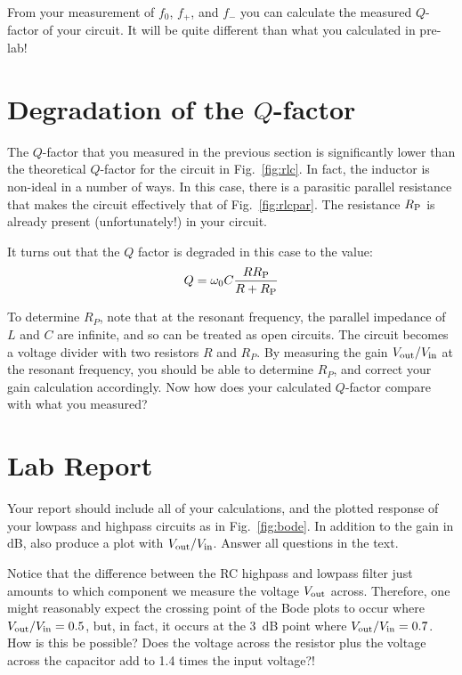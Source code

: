 From your measurement of $f_0$, $f_+$, and $f_-$ you can calculate the measured $Q$-factor of your circuit.  It will be quite different than what you calculated in pre-lab! 

\section{Degradation of the $Q$-factor}

The $Q$-factor that you measured in the previous section is significantly lower than the theoretical $Q$-factor for the circuit in Fig.~\ref{fig:rlc}.  In fact, the inductor is non-ideal in a number of ways.  In this case, there is a parasitic parallel resistance that makes the circuit effectively that of Fig.~\ref{fig:rlcpar}.  The resistance $R_{\rm P}$ is already present (unfortunately!) in your circuit.  

It turns out that the $Q$ factor is degraded in this case to the value:
\begin{equation}
Q = \omega_0 C \frac{R R_{\rm P}}{R+R_{\rm P}}
\end{equation}

To determine $R_P$, note that at the resonant frequency, the parallel impedance of $L$ and $C$ are infinite, and so can be treated as open circuits.  The circuit becomes a voltage divider with two resistors $R$ and $R_P$.  By measuring the gain $V_{\rm out}/V_{\rm in}$ at the resonant frequency, you should be able to determine $R_P$, and correct your gain calculation accordingly.  Now how does your calculated $Q$-factor compare with what you measured?


\section{Lab Report}

Your report should include all of your calculations, and the plotted response of your lowpass and highpass circuits as in Fig.~\ref{fig:bode}.  In addition to the gain in dB, also produce a plot with $V_{\rm out}/V_{\rm in}$.  Answer all questions in the text.

Notice that the difference between the RC highpass and lowpass filter just amounts to which component we measure the voltage $V_{\rm out}$ across.  Therefore, one might reasonably expect the crossing point of the Bode plots to occur where $V_{\rm out}/V_{\rm in} = 0.5$, but, in fact, it occurs at the 3~dB point where $V_{\rm out}/V_{\rm in} = 0.7$.  How is this be possible?  Does the voltage across the resistor plus the voltage across the capacitor add to 1.4 times the input voltage?!

 

